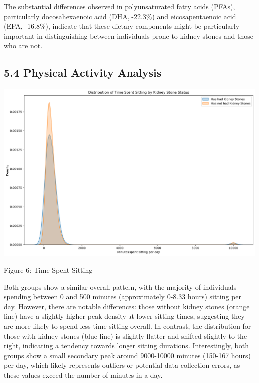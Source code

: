 \documentclass[
]{article}
\begin{document}
The substantial differences observed in polyunsaturated fatty acids
(PFAs), particularly docosahexaenoic acid (DHA, -22.3\%) and
eicosapentaenoic acid (EPA, -16.8\%), indicate that these dietary
components might be particularly important in distinguishing between
individuals prone to kidney stones and those who are not.

\hypertarget{physical-activity-analysis}{%
\subsection{5.4 Physical Activity
Analysis}\label{physical-activity-analysis}}

\includegraphics{../figures/time_spent_sitting_kidney_stones.png}

Figure 6: Time Spent Sitting

Both groups show a similar overall pattern, with the majority of
individuals spending between 0 and 500 minutes (approximately 0-8.33
hours) sitting per day. However, there are notable differences: those
without kidney stones (orange line) have a slightly higher peak density
at lower sitting times, suggesting they are more likely to spend less
time sitting overall. In contrast, the distribution for those with
kidney stones (blue line) is slightly flatter and shifted slightly to
the right, indicating a tendency towards longer sitting durations.
Interestingly, both groups show a small secondary peak around 9000-10000
minutes (150-167 hours) per day, which likely represents outliers or
potential data collection errors, as these values exceed the number of
minutes in a day.
\end{document}
